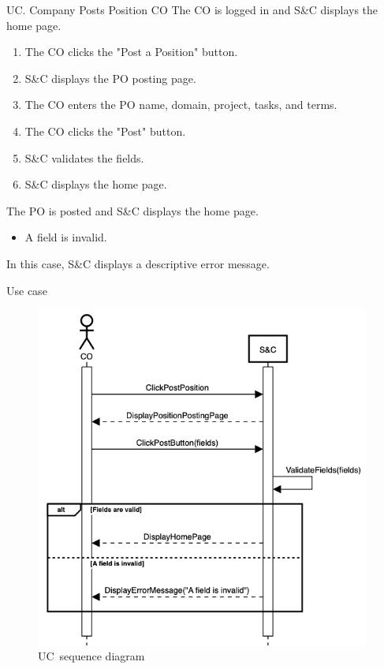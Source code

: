 \begin{usecase}
    {UC\theuc. Company Posts Position}
    {CO}
    {The CO is logged in and S\&C displays the home page.}
    {\begin{enumerate}[leftmargin=*]
        \item The CO clicks the "Post a Position" button.
        \item S\&C displays the PO posting page.
        \item The CO enters the PO name, domain, project, tasks, and terms.
        \item The CO clicks the "Post" button.
        \item S\&C validates the fields.
        \item S\&C displays the home page.
    \end{enumerate}}
    {The PO is posted and S\&C displays the home page.}
    {\begin{itemize}[leftmargin=*, label=\tiny\textbullet]
        \item A field is invalid.
    \end{itemize}
    In this case, S\&C displays a descriptive error message.}
    {Use case \theuc}
\end{usecase}

\begin{figure}
    \centering
    \includegraphics[width=11cm]{images/sequence-diagrams/company-posts-position.png}
    \caption{UC\theuc\ sequence diagram}
\end{figure}

